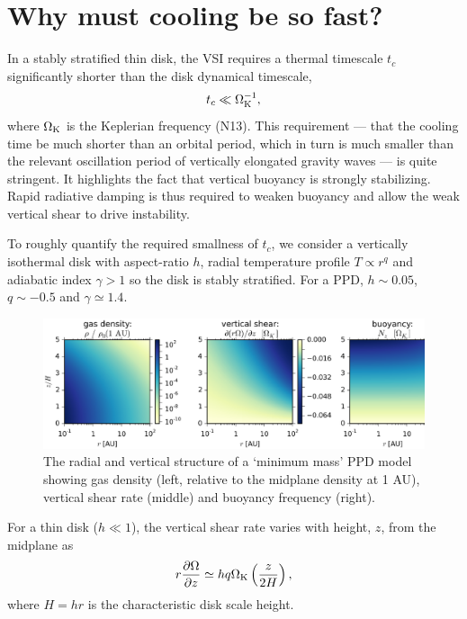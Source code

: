 \documentclass[iop, numberedappendix]{emulateapj}
\newcommand{\p}{\partial}
\def \OmK {\Omega_{\rm K}}
\begin{document}
\section{Why must cooling be so fast?}\label{vsi_require}     
In a stably stratified thin disk, the VSI  
requires a thermal timescale $t_c$ significantly shorter than the
disk dynamical timescale, 
\begin{align}
  t _c \ll \OmK^{-1},
\end{align}
where $\OmK$ is the Keplerian frequency (N13).    
This requirement --- that the cooling time be much shorter than an orbital period, 
which in turn is much smaller than the relevant oscillation period of vertically elongated gravity waves  --- is quite stringent.
It highlights the fact that vertical buoyancy is strongly 
stabilizing. Rapid radiative damping is thus required to weaken
buoyancy and allow the weak vertical shear to drive instability.   

To roughly quantify the required smallness of $t_c$, we consider a
vertically isothermal disk with aspect-ratio $ h$, 
 radial temperature profile $T \propto r^q$ and adiabatic index
$\gamma>1$ so the disk is stably stratified.  For a PPD, $ h \sim 0.05$,
$q\sim -0.5$ and $\gamma\simeq 1.4$.  

\begin{figure}
  \includegraphics[width=\linewidth]{figures/rhoshearNz}
  \caption{The radial and vertical structure of a `minimum mass' PPD model showing gas density (left, relative to the midplane density at 1 AU), vertical shear rate (middle) and
    buoyancy frequency (right).
    \label{eqm_structure} 
  }
\end{figure}

For a thin disk ($h\ll 1$), the vertical shear rate varies with height, $z$, from the midplane as 
\begin{align}\label{vshear_thin}
  r \frac{\p \Omega }{\p z} \simeq  h q \OmK \left(\frac{z}{2 H}\right),
\end{align}
where $H=hr$ is the characteristic disk scale height. 
\end{document}
